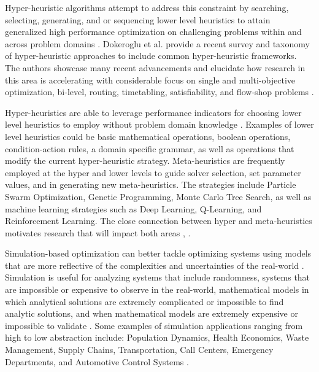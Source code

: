 \documentclass[a4paper]{article}
\begin{document}
Hyper-heuristic algorithms attempt to address this constraint by searching, selecting, generating, and or sequencing lower level heuristics to attain generalized high performance optimization on challenging problems within and across problem domains \cite{burke_search_2014}. Dokeroglu et al. \cite{dokeroglu_hyper-heuristics_2024} provide a recent survey and taxonomy of hyper-heuristic approaches to include common hyper-heuristic frameworks. The authors showcase many recent advancements and elucidate how research in this area is accelerating with considerable focus on single and multi-objective optimization, bi-level, routing, timetabling, satisfiability, and flow-shop problems \cite{dokeroglu_hyper-heuristics_2024}.

Hyper-heuristics are able to leverage performance indicators for choosing lower level heuristics to employ without problem domain knowledge \cite{goos_hyperheuristic_2001}. Examples of lower level heuristics could be basic mathematical operations, boolean operations, condition-action rules, a domain specific grammar, as well as operations that modify the current hyper-heuristic strategy. Meta-heuristics are frequently employed at the hyper and lower levels to guide solver selection, set parameter values, and in generating new meta-heuristics. The strategies include Particle Swarm Optimization, Genetic Programming, Monte Carlo Tree Search, as well as machine learning strategies such as Deep Learning, Q-Learning, and Reinforcement Learning. The close connection between hyper and meta-heuristics motivates research that will impact both areas \cite{burke_search_2014}, \cite{dokeroglu_hyper-heuristics_2024}.

Simulation-based optimization can better tackle optimizing systems using models that are more reflective of the complexities and uncertainties of the real-world \cite{fu_handbook_2015}. Simulation is useful for analyzing systems that include randomness, systems that are impossible or expensive to observe in the real-world, mathematical models in which analytical solutions are extremely complicated or impossible to find analytic solutions, and when mathematical models are extremely expensive or impossible to validate \cite{maria_introduction_1997}. Some examples of simulation applications ranging from high to low abstraction include: Population Dynamics, Health Economics, Waste Management, Supply Chains, Transportation, Call Centers, Emergency Departments, and Automotive Control Systems \cite{borshchev_system_2004}.
\end{document}
